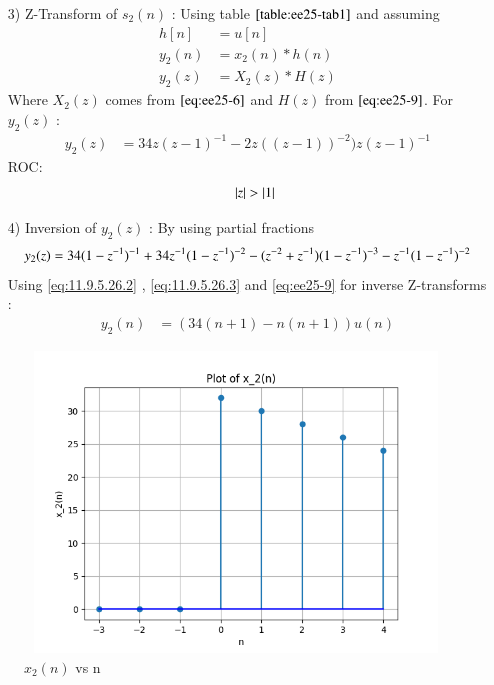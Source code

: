\documentclass[journal,12pt,onecolumn]{IEEEtran}
\theoremstyle{remark}
\begin{document}
\begin{enumerate}
\item[3)]
Z-Transform of $s_2(n)$ :
Using table $\ref{table:ee25-tab1}$ and assuming 
\begin{align}
         h[n] &= u[n] \\
    y_2(n) &= x_2(n) * h(n) \\
    y_2(z) &= X_2(z) * H(z)
    \end{align}
    Where $X_2(z)$ comes from $\eqref{eq:ee25-6}$ and $H(z)$ from $\eqref{eq:ee25-9}$.
    For $y_2(z)$ :
    \begin{align}
            y_2(z) &= 34z(z-1)^{-1}-
       2z((z-1))^{-2})z(z-1)^{-1}
    \end{align}
    ROC:
    \begin{align} 
\quad \left\vert z\right\vert>\left\vert1\right\vert 
    \end{align}
\end{enumerate}

    \begin{enumerate}
    \item[4)]
Inversion of $y_2(z)$ :
By using partial fractions 
\begin{align}
    y_2(z) = \notag34(1-z^{-1})^{-1} + 34z^{-1}(1-z^{-1})^{-2} - (z^{-2} + z^{-1})(1-z^{-1})^{-3} - z^{-1}(1-z^{-1})^{-2}  
\end{align}
Using \eqref{eq:11.9.5.26.2} , \eqref{eq:11.9.5.26.3} and \eqref{eq:ee25-9} for inverse Z-transforms :
\begin{align}
 y_2(n) &= (34(n+1) - n(n+1))u(n)   
\end{align}
\end{enumerate}



\begin{figure}[!ht]
\centering
  \graphicspath{ {figs/} }
\includegraphics[width=12cm, height=8cm]{graph_2}
\caption{$x_2(n)$ vs n }
\label{graph:ee25-g3}
\end{figure}
\end{document}
